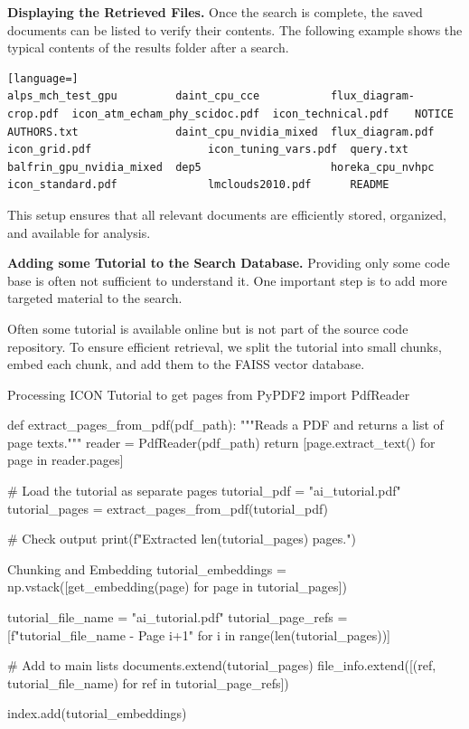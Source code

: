 \bigskip
{\bf Displaying the Retrieved Files.}
Once the search is complete, the saved documents can be listed to verify their contents. The following 
example shows the typical contents of the results folder after a search.

\begin{lstlisting}[language=]
alps_mch_test_gpu         daint_cpu_cce           flux_diagram-crop.pdf  icon_atm_echam_phy_scidoc.pdf  icon_technical.pdf    NOTICE
AUTHORS.txt               daint_cpu_nvidia_mixed  flux_diagram.pdf       icon_grid.pdf                  icon_tuning_vars.pdf  query.txt
balfrin_gpu_nvidia_mixed  dep5                    horeka_cpu_nvhpc       icon_standard.pdf              lmclouds2010.pdf      README
\end{lstlisting}

This setup ensures that all relevant documents are efficiently stored, organized, and available for analysis.

\bigskip
{\bf Adding some Tutorial to the Search Database.}
Providing only some code base is often not sufficient to understand it. One important step is to add more targeted material to the search. 

Often some tutorial is available online but is not part of the source code repository. To ensure efficient retrieval, we split the tutorial into small chunks, embed each chunk, and add them to the FAISS vector database.

\begin{codeonly}{Processing ICON Tutorial to get pages}
from PyPDF2 import PdfReader

def extract_pages_from_pdf(pdf_path):
    """Reads a PDF and returns a list of page texts."""
    reader = PdfReader(pdf_path)
    return [page.extract_text() for page in reader.pages]

# Load the tutorial as separate pages
tutorial_pdf = "ai_tutorial.pdf"
tutorial_pages = extract_pages_from_pdf(tutorial_pdf)

# Check output
print(f"Extracted {len(tutorial_pages)} pages.")
\end{codeonly}

\begin{codeonly}{Chunking and Embedding}
tutorial_embeddings = np.vstack([get_embedding(page) for page in tutorial_pages])

tutorial_file_name = "ai_tutorial.pdf"
tutorial_page_refs = [f"{tutorial_file_name} - Page {i+1}" for i in range(len(tutorial_pages))]

# Add to main lists
documents.extend(tutorial_pages)
file_info.extend([(ref, tutorial_file_name) for ref in tutorial_page_refs])

index.add(tutorial_embeddings)
\end{codeonly}

